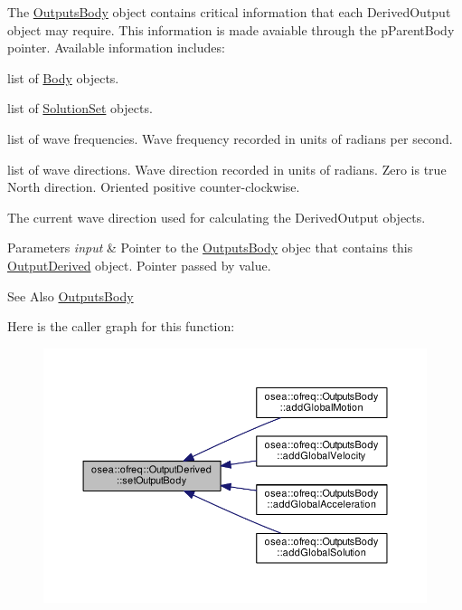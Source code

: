 The \hyperlink{classosea_1_1ofreq_1_1_outputs_body}{Outputs\-Body} object contains critical information that each Derived\-Output object may require. This information is made avaiable through the p\-Parent\-Body pointer. Available information includes\-:
\begin{DoxyItemize}
\item list of \hyperlink{classosea_1_1ofreq_1_1_body}{Body} objects.
\item list of \hyperlink{classosea_1_1ofreq_1_1_solution_set}{Solution\-Set} objects.
\item list of wave frequencies. Wave frequency recorded in units of radians per second.
\item list of wave directions. Wave direction recorded in units of radians. Zero is true North direction. Oriented positive counter-\/clockwise.
\item The current wave direction used for calculating the Derived\-Output objects. 
\begin{DoxyParams}{Parameters}
{\em input} & Pointer to the \hyperlink{classosea_1_1ofreq_1_1_outputs_body}{Outputs\-Body} objec that contains this \hyperlink{classosea_1_1ofreq_1_1_output_derived}{Output\-Derived} object. Pointer passed by value.\\
\hline
\end{DoxyParams}
\begin{DoxySeeAlso}{See Also}
\hyperlink{classosea_1_1ofreq_1_1_outputs_body}{Outputs\-Body} 
\end{DoxySeeAlso}

\end{DoxyItemize}

Here is the caller graph for this function\-:
\nopagebreak
\begin{figure}[H]
\begin{center}
\leavevmode
\includegraphics[width=350pt]{classosea_1_1ofreq_1_1_output_derived_affb9fc146d9322b1d991cc5f5ae546d7_icgraph}
\end{center}
\end{figure}




